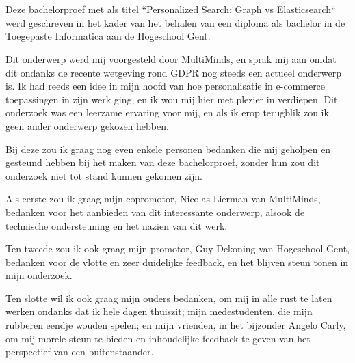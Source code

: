 
\chapter*{}
\label{ch:voorwoord}


Deze bachelorproef met als titel ``Personalized Search: Graph vs Elasticsearch`` werd geschreven in het kader van het behalen van een diploma als bachelor in de Toegepaste Informatica aan de Hogeschool Gent.

Dit onderwerp werd mij voorgesteld door MultiMinds, en sprak mij aan omdat dit ondanks de recente wetgeving rond GDPR nog steeds een actueel onderwerp is. Ik had reeds een idee in mijn hoofd  van hoe personalisatie in e-commerce toepassingen in zijn werk ging, en ik wou mij hier met plezier in verdiepen. Dit onderzoek was een leerzame ervaring voor mij, en als ik erop terugblik zou ik geen ander onderwerp gekozen hebben. 

Bij deze zou ik graag nog even enkele personen bedanken die mij geholpen en gesteund hebben bij het maken van deze bachelorproef, zonder hun zou dit onderzoek niet tot stand kunnen gekomen zijn.

Als eerste zou ik graag mijn copromotor, Nicolas Lierman van MultiMinds, bedanken voor het aanbieden van dit interessante onderwerp, alsook de technische ondersteuning en het nazien van dit werk.

Ten tweede zou ik ook graag mijn promotor, Guy Dekoning van Hogeschool Gent, bedanken voor de vlotte en zeer duidelijke feedback, en het blijven steun tonen in mijn onderzoek. 

Ten slotte wil ik ook graag mijn ouders bedanken, om mij in alle rust te laten werken ondanks dat ik hele dagen thuiszit; mijn medestudenten, die mijn rubberen eendje wouden spelen; en mijn vrienden, in het bijzonder Angelo Carly, om mij morele steun te bieden en inhoudelijke feedback te geven van het perspectief van een buitenstaander.


